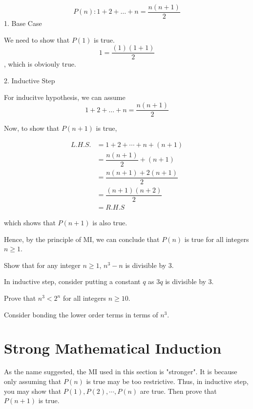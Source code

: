 \begin{eg}
  \[
    P(n): 1 + 2 + \dots + n = \dfrac{n(n+1)}{2}
  \] 
  1. Base Case

  We need to show that \(P(1)\) is true. 
  \[
    1 = \dfrac{(1)(1+1)}{2}
  \] 
  , which is obviouly true.
  
  2. Inductive Step

  For inducitve hypothesis, we can assume \[1 + 2 + \dots + n = \dfrac{n(n+1)}{2}\]

  Now, to show that \(P(n+1)\) is true, 

  \[
  \begin{aligned}
    L.H.S. &= 1 + 2 + \cdots + n + (n+1)\\
    &= \dfrac{n(n+1)}{2} + (n+1) \\
    &= \dfrac{n(n+1) + 2(n+1)}{2} \\
    &= \dfrac{(n+1)(n+2)}{2} \\
    &= R.H.S
  \end{aligned}
  \]

  which shows that \(P(n+1)\) is also true.

  Hence, by the principle of MI, we can conclude that \(P(n)\) is true for all integers \(n \geq 1\).
\end{eg}

\begin{exercise}
  Show that for any integer \(n \geq 1\), \(n^3 - n\) is divisible by 3.
  \begin{note}
    In inductive step, consider putting a constant \(q\) as \(3q\) is divisible by 3.
  \end{note}
\end{exercise}

\begin{exercise}
  Prove that \(n^3 < 2^n\) for all integers \(n \geq 10\).  
  \begin{note}
    Consider bonding the lower order terms in terms of \(n^3\).
  \end{note}
\end{exercise}

\section{Strong Mathematical Induction}
As the name suggested, the MI used in this section is "stronger". It is because only assuming that \(P(n)\) is true may be too restrictive. Thus, in inductive step, you may show that \(P(1), P(2), \cdots, P(n)\) are true. Then prove that \(P(n+1)\) is true.

